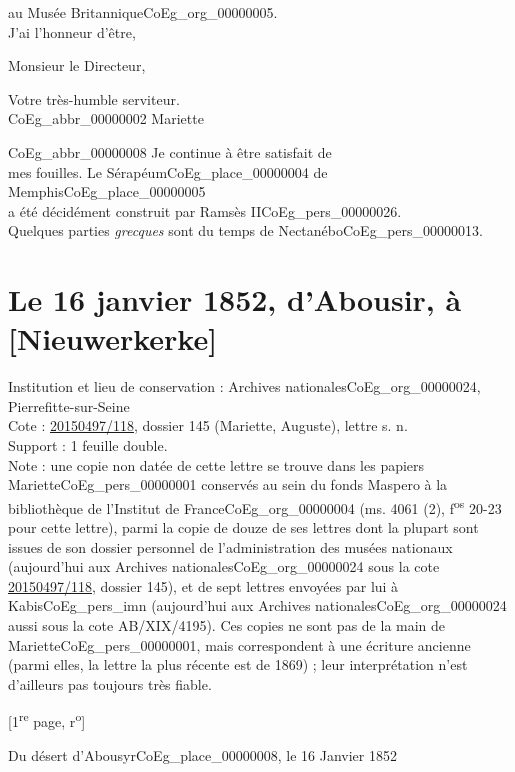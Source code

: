 \documentclass{book}
\begin{document}
au Musée Britannique\gls{CoEg_org_00000005}.\\
\indent J’ai l’honneur d’être,
\begin{center}Monsieur le Directeur,\end{center}
\begin{center}\hspace{5cm}Votre très-humble serviteur.\\
\hspace{5cm}\gls{CoEg_abbr_00000002} Mariette\end{center}
\noindent \gls{CoEg_abbr_00000008} Je continue à être satisfait de\\
mes fouilles. Le Sérapéum\gls{CoEg_place_00000004} de Memphis\gls{CoEg_place_00000005}\\
a été décidément construit par Ramsès II\gls{CoEg_pers_00000026}.\\
Quelques parties \textit{grecques} sont du temps de Nectanébo\gls{CoEg_pers_00000013}.
\section*{Le 16 janvier 1852, d'Abousir, à [Nieuwerkerke]} \label{CoEg_Mariette_1852-01-16} 
{\footnotesize
\noindent Institution et lieu de conservation : Archives nationales\gls{CoEg_org_00000024}, Pierrefitte-sur-Seine\\
Cote : \hyperref[CoEg_Mariette_ms_001]{20150497/118}, dossier 145 (Mariette, Auguste), lettre s. n.\\
Support : 1 feuille double.\\
Note : une copie non datée de cette lettre se trouve dans les papiers Mariette\gls{CoEg_pers_00000001} conservés au sein du fonds Maspero à la bibliothèque de l'Institut de France\gls{CoEg_org_00000004} (ms. 4061 (2), f\textsuperscript{os} 20-23 pour cette lettre), parmi la copie de douze de ses lettres dont la plupart sont issues de son dossier personnel de l'administration des musées nationaux (aujourd'hui aux Archives nationales\gls{CoEg_org_00000024} sous la cote \hyperref[CoEg_Mariette_ms_001]{20150497/118}, dossier 145), et de sept lettres envoyées par lui à Kabis\gls{CoEg_pers_imn} (aujourd'hui aux Archives nationales\gls{CoEg_org_00000024} aussi sous la cote AB/XIX/4195). Ces copies ne sont pas de la main de Mariette\gls{CoEg_pers_00000001}, mais correspondent à une écriture ancienne (parmi elles, la lettre la plus récente est de 1869) ; leur interprétation n'est d'ailleurs pas toujours très fiable.
\begin{center} {[1\textsuperscript{re} page, r\textsuperscript{o}]}\end{center}}
\begin{flushright}Du désert d’Abousyr\gls{CoEg_place_00000008}, le 16 Janvier 1852\end{flushright}
\end{document}
